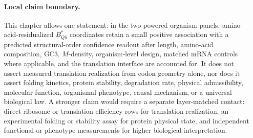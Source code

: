 \paragraph{Local claim boundary.}
This chapter allows one statement: in the two powered organism panels, amino-acid-residualized $B^{\ast}_{Q6}$ coordinates retain a small positive association with a predicted structural-order confidence readout after length, amino-acid composition, GC3, $M$-density, organism-level design, matched mRNA controls where applicable, and the translation interface are accounted for.  It does not assert measured translation realization from codon geometry alone, nor does it assert folding kinetics, protein stability, degradation rate, physical admissibility, molecular function, organismal phenotype, causal mechanism, or a universal biological law.  A stronger claim would require a separate layer-matched contact: direct ribosome or translation-efficiency rows for translation realization, an experimental folding or stability assay for protein physical state, and independent functional or phenotype measurements for higher biological interpretation.